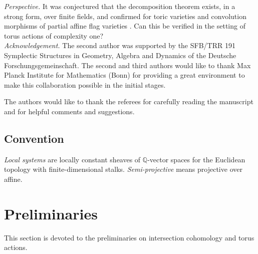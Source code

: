 \documentclass[11pt, reqno]{amsart}
\theoremstyle{plain}
\theoremstyle{definition}
\theoremstyle{remark}
\begin{document}
\emph{Perspective.}
It was conjectured \cite{CHL18} that  the decomposition theorem exists, in a strong form, over finite fields, and confirmed for toric varieties \cite{Cat15} and convolution morphisms of partial affine flag varieties \cite[Section 6]{CHL18}. Can this be verified in the setting of torus actions of complexity one? 
\\

\emph{Acknowledgement.}
The second author was supported by the SFB/TRR 191 Symplectic Structures in Geometry, Algebra and Dynamics of the Deutsche Forschungsgemeinschaft. The second and third authors would like to thank Max Planck Institute for Mathematics (Bonn) for providing a great environment to make this collaboration possible in the initial stages.

The authors would like to thank the referees for carefully reading the manuscript
and for helpful comments and suggestions.



\subsection{Convention} \label{sec-varalg}
 \emph{Local systems} are  locally constant sheaves of $\mathbb{Q}$-vector spaces for the Euclidean topology with finite-dimensional stalks. \emph{Semi-projective} means projective over affine.

\section{Preliminaries}\label{sec-two}
This section is devoted to the preliminaries on intersection cohomology and torus actions. 
\end{document}
